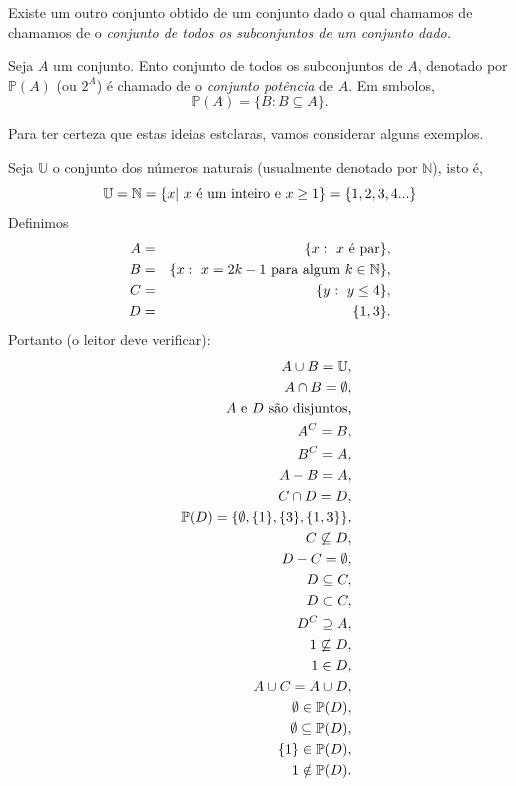 Existe um outro conjunto obtido de um conjunto dado o qual chamamos de chamamos de o {\it conjunto de todos os subconjuntos de um conjunto dado.}

\begin{definb}
Seja $A$ um conjunto. Ent\ao o conjunto de todos os subconjuntos de $A$, denotado por $\mathbb{P}(A)$ (ou $2^{A}$) \'e chamado de o {\it conjunto pot\^encia} de $A$. Em s\ih mbolos, 
\[
\mathbb{P}(A) = \{B:B\subseteq A\}. 
\]
\end{definb}
Para ter certeza que estas ideias est\ao claras, vamos considerar alguns exemplos.

Seja $\mathbb{U}$ o conjunto dos n\'umeros naturais (usualmente denotado por $\mathbb{N}$), isto \'e,
\[
\mathbb{U}=\mathbb{N}=\{x|\textrm{ } x \textrm{ \'e um inteiro e $x\geq 1$}\}=\{1,2,3,4...\}
\]
Definimos
\begin{eqnarray*}
A&=&\{x:\textrm{ } x \textrm{ \'e par}\},\\
B&=&\{x:\textrm{ } x=2k-1 \textrm{ para algum } k\in\mathbb{N}\},\\
C&=&\{y:\textrm{ } y\leq 4\},\\
D&=&\{1,3\}.\\
\end{eqnarray*}
Portanto (o leitor deve verificar):
\begin{eqnarray*}
&& A\cup B = \mathbb{U},\\
&& A\cap B = \emptyset,\\
&& \textrm{$A$ e $D$ s\~ao disjuntos,}\\
&& A^C=B,\\
&& B^C=A,\\
&& A-B=A,\\
&& C\cap D=D,\\
&& \mathbb{P}(D)=\{\emptyset,\{1\},\{3\},\{1,3\}\},\\
&& C\not\subseteq D,\\
&& D-C=\emptyset,\\
&& D\subseteq C,\\
&& D\subset C,\\
&& D^C\supseteq A,\\
&& 1\not\subseteq D,\\
&& 1\in D,\\
&& A\cup C=A\cup D,\\
&& \emptyset\in \mathbb{P}(D),\\
&& \emptyset\subseteq\mathbb{P}(D),\\
&& \{1\}\in\mathbb{P}(D),\\
&& 1\notin\mathbb{P}(D).
\end{eqnarray*}


